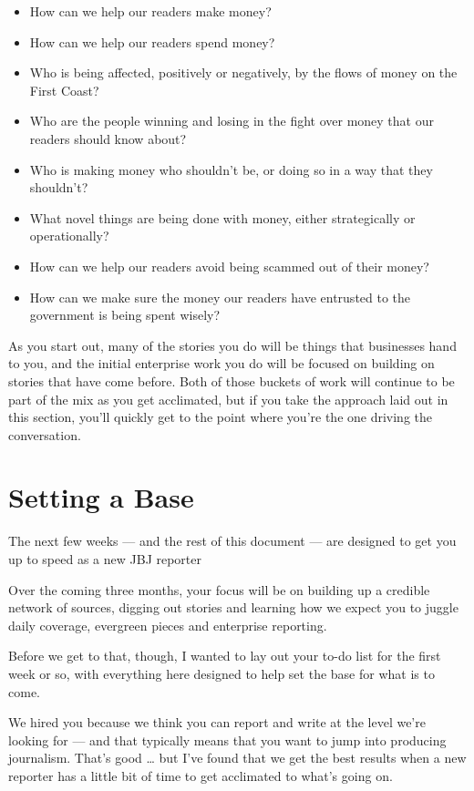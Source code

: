 \documentclass[
  11pt,
  american,
  letterpaperpaper,
  extrafontsizes,onecolumn,openright
  ]{memoir}
\providecommand{\tightlist}{%
  \setlength{\itemsep}{0pt}\setlength{\parskip}{0pt}}
\begin{document}
\begin{itemize}
\tightlist
\item
  How can we help our readers make money?
\item
  How can we help our readers spend money?
\item
  Who is being affected, positively or negatively, by the flows of money on the First Coast?
\item
  Who are the people winning and losing in the fight over money that our readers should know about?
\item
  Who is making money who shouldn't be, or doing so in a way that they shouldn't?
\item
  What novel things are being done with money, either strategically or operationally?
\item
  How can we help our readers avoid being scammed out of their money?
\item
  How can we make sure the money our readers have entrusted to the government is being spent wisely?
\end{itemize}

As you start out, many of the stories you do will be things that businesses hand to you, and the initial enterprise work you do will be focused on building on stories that have come before. Both of those buckets of work will continue to be part of the mix as you get acclimated, but if you take the approach laid out in this section, you'll quickly get to the point where you're the one driving the conversation.

\hypertarget{setting-a-base}{%
\chapter{Setting a Base}\label{setting-a-base}}

The next few weeks --- and the rest of this document --- are designed to get you up to speed as a new JBJ reporter

Over the coming three months, your focus will be on building up a credible network of sources, digging out stories and learning how we expect you to juggle daily coverage, evergreen pieces and enterprise reporting.

Before we get to that, though, I wanted to lay out your to-do list for the first week or so, with everything here designed to help set the base for what is to come.

\leavevmode{}%
\begin{greybox}[frametitle=Onboarding Path]
We hired you because we think you can report and write at the level we're looking for --- and that typically means that you want to jump into producing journalism. That's good \ldots{} but I've found that we get the best results when a new reporter has a little bit of time to get acclimated to what's going on.

\end{greybox}
\end{document}
